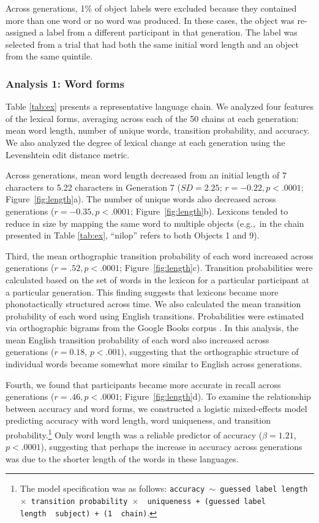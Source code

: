 Across generations, 1\% of object labels were excluded because they contained more than one word or no word was produced. In these cases, the object was re-assigned a label from a different participant in that generation. The label was selected from a trial that had both the same initial word length and an object from the same quintile. 

\subsubsection{Analysis 1: Word forms}



Table \ref{tab:ex} presents a representative language chain. We analyzed four features of the lexical forms, averaging across each of the 50 chains at each generation: mean word length, number of unique words, transition probability, and accuracy. We also analyzed the degree of lexical change at each generation using the Levenshtein edit distance metric.

Across generations, mean word length decreased from an initial length of 7 characters to 5.22 characters in Generation 7 ($SD= 2.25$; $r=-0.22, p<.0001$; Figure\ \ref{fig:length}a). The number of unique words also decreased across generations ($r=-0.35, p<.0001$; Figure\ \ref{fig:length}b). Lexicons tended to reduce in size by mapping the same word to multiple objects (e.g.,\ in the chain presented in Table \ref{tab:ex}, ``nilop'' refers to both Objects 1 and 9).




Third, the mean orthographic transition probability of each word increased across generations ($r=.52, p<.0001$; Figure\ \ref{fig:length}c). Transition probabilities were calculated based on the set of words in the lexicon for a particular participant at a particular generation. This finding suggests that lexicons became more phonotactically structured across time. We also calculated the mean transition probability of each word using English transitions. Probabilities were estimated via orthographic bigrams from the Google Books corpus \cite{norvig}. In this analysis, the mean English transition probability of each word also increased across generations ($r=0.18$, $p <.001$), suggesting that the orthographic structure of individual words became somewhat more similar to English across generations. %


Fourth, we found that participants became more accurate in recall across generations ($r=.46, p<.0001$; Figure\ \ref{fig:length}d). To examine the relationship between accuracy and word forms, we constructed a logistic mixed-effects model predicting accuracy with word length, word uniqueness, and transition probability.\footnote{The model specification was as follows: \texttt{accuracy $\sim$ guessed label length~$\times$~transition probability~$\times$~ uniqueness + (guessed label length~\textbar~subject) +  (1~\textbar~chain)}.} Only word length was a reliable predictor of accuracy ($\beta=1.21$, $p <.0001$), suggesting that perhaps the increase in accuracy across generations was due to the shorter length of the words in these languages. %

